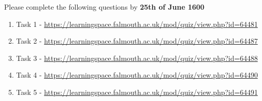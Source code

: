 \documentclass{../../../fal_assignment}
\begin{document}
	Please complete the following questions by \textbf{25th of June 1600}
	
	\begin{enumerate}
		\item Task 1 - \href{https://learningspace.falmouth.ac.uk/mod/quiz/view.php?id=64481}{https://learningspace.falmouth.ac.uk/mod/quiz/view.php?id=64481}
		\item Task 2 - \href{https://learningspace.falmouth.ac.uk/mod/quiz/view.php?id=64487}{https://learningspace.falmouth.ac.uk/mod/quiz/view.php?id=64487}
		\item Task 3 - \href{https://learningspace.falmouth.ac.uk/mod/quiz/view.php?id=64488}{{https://learningspace.falmouth.ac.uk/mod/quiz/view.php?id=64488}}
		\item Task 4 - \href{https://learningspace.falmouth.ac.uk/mod/quiz/view.php?id=64490}{https://learningspace.falmouth.ac.uk/mod/quiz/view.php?id=64490}
		\item Task 5 - \href{https://learningspace.falmouth.ac.uk/mod/quiz/view.php?id=64491}{https://learningspace.falmouth.ac.uk/mod/quiz/view.php?id=64491}
	\end{enumerate}
	
\end{document}
